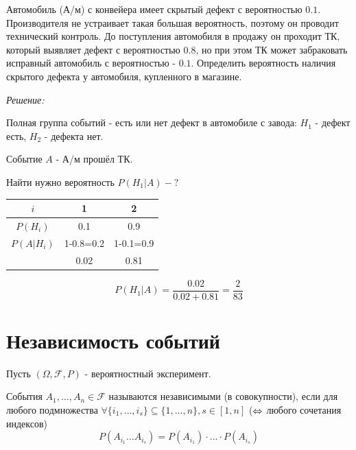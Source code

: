 \begin{exmp}
	Автомобиль (А/м) с конвейера имеет скрытый дефект с вероятностью $0.1$. Производителя не устраивает такая большая вероятность, поэтому он проводит технический контроль. До поступления автомобиля в продажу он проходит ТК, который выявляет дефект с вероятностью $0.8$, но при этом ТК может забраковать исправный автомобиль с вероятностью - $0.1$. Определить вероятность наличия скрытого дефекта у автомобиля, купленного в магазине.
	
	\textit{Решение:}
	
	Полная группа событий - есть или нет дефект в автомобиле с завода: $H_1$ - дефект есть, $H_2$ - дефекта нет.
	
	Событие $A$ - А/м прошёл ТК.
	
	Найти нужно вероятность $P(H_1|A) - ?$
	
	\begin{table}[H]
		\begin{tabular}{ccc}
			\hline
			\multicolumn{1}{|c|}{$i$}        & \multicolumn{1}{c|}{1}         & \multicolumn{1}{c|}{2}         \\ \hline
			\multicolumn{1}{|c|}{$P(H_i)$}   & \multicolumn{1}{c|}{0.1}       & \multicolumn{1}{c|}{0.9}       \\ \hline
			\multicolumn{1}{|c|}{$P(A|H_i)$} & \multicolumn{1}{c|}{1-0.8=0.2} & \multicolumn{1}{c|}{1-0.1=0.9} \\ \hline
			& 0.02                           & 0.81                          
		\end{tabular}
	\end{table}

	\[ P(H_1|A) = \dfrac{0.02}{0.02 + 0.81} = \dfrac{2}{83} \]
\end{exmp}

\section{Независимость событий}

\begin{definition}
	Пусть $(\Omega, \mathcal{F}, P)$ - вероятностный эксперимент.
	
	События $A_1, \dots, A_n \in \mathcal{F}$ называются независимыми (в совокупности), если для любого подмножества $\forall \{ i_1, \dots, i_s \} \subseteq \{ 1, \dots, n \}, s \in [1, n]$ ($\operatorname{\Leftrightarrow}$ любого сочетания индексов)
	\[ P(A_{i_1} \dots A_{i_s}) = P(A_{i_1}) \cdot ... \cdot P(A_{i_s}) \]
\end{definition}

